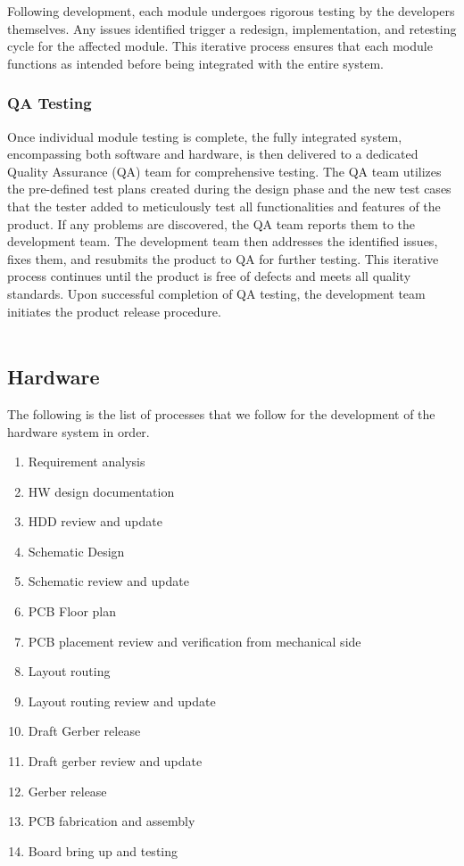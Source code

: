 \documentclass[a4paper,12pt]{article}
\begin{document}
	Following development, each module undergoes rigorous testing by the developers themselves. Any issues identified trigger a redesign, implementation, and retesting cycle for the affected module. This iterative process ensures that each module functions as intended before being integrated with the entire system.
	
 \subsubsection{QA Testing}
	
	Once individual module testing is complete, the fully integrated system, encompassing both software and hardware, is then delivered to a dedicated Quality Assurance (QA) team for comprehensive testing. The QA team utilizes the pre-defined test plans created during the design phase and the new test cases that the tester added to meticulously test all functionalities and features of the product. If any problems are discovered, the QA team reports them to the development team. The development team then addresses the identified issues, fixes them, and resubmits the product to QA for further testing. This iterative process continues until the product is free of defects and meets all quality standards. Upon successful completion of QA testing, the development team initiates the product release procedure.
	\\
	\\
	\noindent
	\subsection{Hardware }
	\noindent
	The following is the list of processes that we follow for the development of the hardware system in order.
	\begin{enumerate}
		\item Requirement analysis
		\item HW design documentation
		\item HDD review and update
		\item Schematic Design
		\item Schematic review and update
		\item PCB Floor plan
		\item PCB placement review and verification from mechanical side
		\item Layout routing
		\item Layout routing  review and update
		\item Draft Gerber release
		\item Draft gerber review and update
		\item Gerber release
		\item PCB fabrication and assembly
		\item Board bring up and testing
	\end{enumerate}
\end{document}
